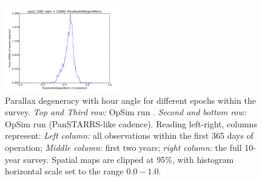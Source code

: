 \begin{figure}[ht]
\begin{center}
  \includegraphics[width=2.0in]{./figs/milkyway/MW_Astrom_paDegen_1092_10y_hst.pdf}
  \end{center}
  \caption{Parallax degeneracy with hour angle for different epochs within the survey. {\it Top and Third row:} OpSim run . {\it Second and bottom row:} OpSim run  (PanSTARRS-like cadence). Reading left-right, columns represent: {\it Left column:} all observations within the first 365 days of operation; {\it Middle column:} first two years; {\it right column:} the full 10-year survey. Spatial maps are clipped at 95\%, with histogram horizontal scale set to the range $0.0-1.0$.}
  \label{fig_astrom_ByTime_PADegen}
\end{figure}



